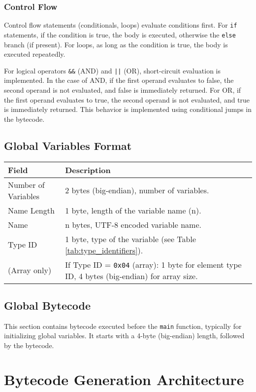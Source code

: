 \documentclass[a4paper,12pt]{article}
\begin{document}
\subsubsection{Control Flow}
  Control flow statements (conditionals, loops) evaluate conditions first. For \texttt{if} statements, if the condition is true, the body is executed, otherwise the \texttt{else} branch (if present). For loops, as long as the condition is true, the body is executed repeatedly.

  For logical operators \texttt{\&\&} (AND) and \texttt{||} (OR), short-circuit evaluation is implemented. In the case of AND, if the first operand evaluates to false, the second operand is not evaluated, and false is immediately returned. For OR, if the first operand evaluates to true, the second operand is not evaluated, and true is immediately returned. This behavior is implemented using conditional jumps in the bytecode.

\subsection{Global Variables Format}
\begin{tabular}{|l|p{9cm}|}
\hline
\textbf{Field} & \textbf{Description} \\ \hline
  Number of Variables & 2 bytes (big-endian), number of variables. \\ \hline
  Name Length & 1 byte, length of the variable name (n). \\ \hline
  Name & n bytes, UTF-8 encoded variable name. \\ \hline
  Type ID & 1 byte, type of the variable (see Table \ref{tab:type_identifiers}). \\ \hline
  (Array only) & If Type ID = \texttt{0x04} (array): 1 byte for element type ID, 4 bytes (big-endian) for array size. \\ \hline
\end{tabular}
\label{tab:global_variables_format}

\subsection{Global Bytecode}
  This section contains bytecode executed before the \texttt{main} function, typically for initializing global variables. It starts with a 4-byte (big-endian) length, followed by the bytecode.

\section{Bytecode Generation Architecture}
\end{document}
